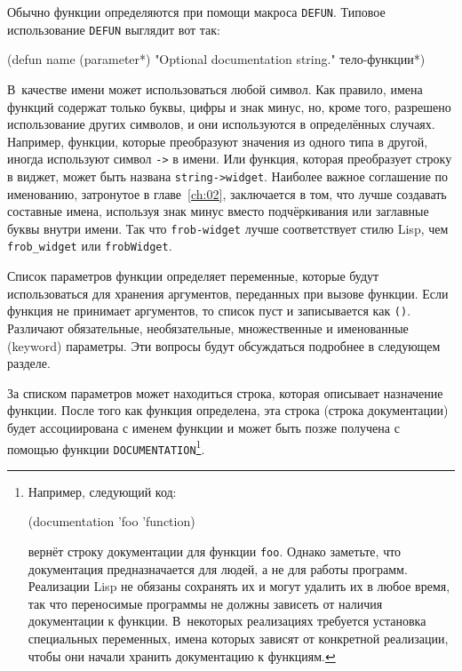 Обычно функции определяются при помощи макроса \lstinline{DEFUN}.  Типовое использование
\lstinline{DEFUN} выглядит вот так:

\begin{myverb}
(defun name (parameter*)
  "Optional documentation string."
  тело-функции*)
\end{myverb}

В~качестве имени может использоваться любой символ.  Как правило, имена функций содержат только буквы, цифры и
знак минус, но, кроме того, разрешено использование других символов, и они используются в
определённых случаях.  Например, функции, которые преобразуют значения из одного типа в
другой, иногда используют символ \lstinline{->} в имени. Или функция, которая преобразует
строку в виджет, может быть названа \lstinline{string->widget}.  Наиболее важное соглашение по
именованию, затронутое в главе~\ref{ch:02}, заключается в том, что лучше создавать составные имена,
используя знак минус вместо подчёркивания или заглавные буквы внутри имени.
Так что \lstinline{frob-widget} лучше соответствует стилю Lisp, чем \lstinline!frob_widget! или
\lstinline{frobWidget}.

Список параметров функции определяет переменные, которые будут использоваться для хранения
аргументов, переданных при вызове функции.  Если функция не принимает аргументов, то список пуст и
записывается как \lstinline{()}. Различают обязательные, необязательные, множественные и
именованные (keyword) параметры.  Эти вопросы будут обсуждаться подробнее в следующем
разделе.

За списком параметров может находиться строка, которая описывает назначение функции.
После того как функция определена, эта строка (строка документации) будет ассоциирована
с именем функции и может быть позже получена с помощью функции
\lstinline{DOCUMENTATION}\footnote{Например, следующий код:

\begin{myverb}
(documentation 'foo 'function)
\end{myverb}

\noindent{}вернёт строку документации для функции \lstinline{foo}.  Однако заметьте, что документация
предназначается для людей, а не для работы программ.  Реализации Lisp не обязаны сохранять
их и могут удалить их в любое время, так что переносимые программы не должны
зависеть от наличия документации к функции.  В~некоторых реализациях требуется установка
специальных переменных, имена которых зависят от конкретной реализации, чтобы они начали
хранить документацию к функциям.}\hspace{\footnotenegspace}.


